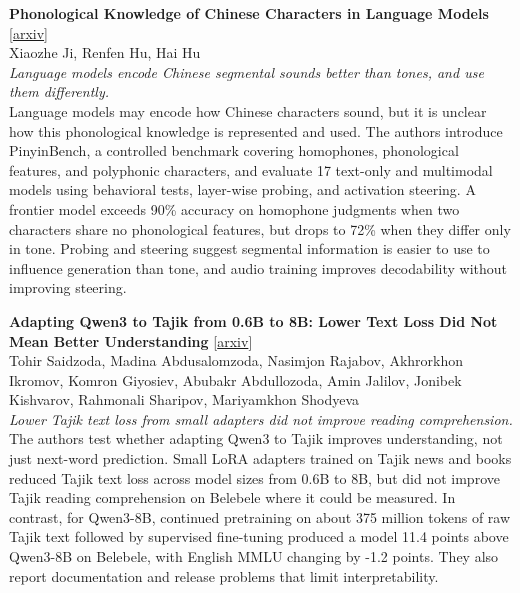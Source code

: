 \documentclass[12pt,letterpaper]{article}
\begin{document}
\medskip
\begin{minipage}{\linewidth}
{\small\textbf{Phonological Knowledge of Chinese Characters in Language Models}} {\scriptsize[\href{https://arxiv.org/abs/2611.05803}{arxiv}]}\\
{\scriptsize Xiaozhe Ji, Renfen Hu, Hai Hu}\\
{\footnotesize\textit{Language models encode Chinese segmental sounds better than tones, and use them differently.}}\\[2pt]
{\footnotesize Language models may encode how Chinese characters sound, but it is unclear how this phonological knowledge is represented and used. The authors introduce PinyinBench, a controlled benchmark covering homophones, phonological features, and polyphonic characters, and evaluate 17 text-only and multimodal models using behavioral tests, layer-wise probing, and activation steering. A frontier model exceeds 90\% accuracy on homophone judgments when two characters share no phonological features, but drops to 72\% when they differ only in tone. Probing and steering suggest segmental information is easier to use to influence generation than tone, and audio training improves decodability without improving steering.}
\end{minipage}

\medskip
\begin{minipage}{\linewidth}
{\small\textbf{Adapting Qwen3 to Tajik from 0.6B to 8B: Lower Text Loss Did Not Mean Better Understanding}} {\scriptsize[\href{https://arxiv.org/abs/2611.06062}{arxiv}]}\\
{\scriptsize Tohir Saidzoda, Madina Abdusalomzoda, Nasimjon Rajabov, Akhrorkhon Ikromov, Komron Giyosiev, Abubakr Abdullozoda, Amin Jalilov, Jonibek Kishvarov, Rahmonali Sharipov, Mariyamkhon Shodyeva}\\
{\footnotesize\textit{Lower Tajik text loss from small adapters did not improve reading comprehension.}}\\[2pt]
{\footnotesize The authors test whether adapting Qwen3 to Tajik improves understanding, not just next-word prediction. Small LoRA adapters trained on Tajik news and books reduced Tajik text loss across model sizes from 0.6B to 8B, but did not improve Tajik reading comprehension on Belebele where it could be measured. In contrast, for Qwen3-8B, continued pretraining on about 375 million tokens of raw Tajik text followed by supervised fine-tuning produced a model 11.4 points above Qwen3-8B on Belebele, with English MMLU changing by -1.2 points. They also report documentation and release problems that limit interpretability.}
\end{minipage}
\end{document}
